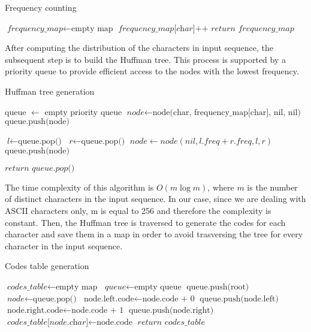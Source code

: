\documentclass{report}
\begin{document}
\begin{algorithm}
\caption{Frequency counting}
\begin{algorithmic}[1]
\State $\textit{frequency\_map} \gets \text{empty map}$
\State $\textit{frequency\_map[char]++}$
\EndFor
\State $ \textit{return frequency\_map}$
\EndProcedure
\end{algorithmic}
\end{algorithm}
After computing the distribution of the characters in input sequence,
the subsequent step is to build the Huffman tree.
This process is supported by a priority queue to provide
efficient access to the nodes with the lowest frequency.
\begin{algorithm}
\caption{Huffman tree generation}
\begin{algorithmic}[1]
\State queue $\gets$ empty priority queue
\State $\textit{node} \gets \text{node(char, frequency\_map[char], nil, nil)}$
\State $\text{queue.push(node)}$
\EndFor

\State $\textit{l} \gets \text{queue.pop()}$
\State $\textit{r} \gets \text{queue.pop()}$
\State $\textit{node} \gets node(nil, l.freq + r.freq, l, r)$
\State $\text{queue.push(node)}$
\EndWhile

\State $ \textit{return queue.pop()}$

\EndProcedure
\end{algorithmic}
\end{algorithm}
The time complexity of this algorithm is $O(m \log m)$,
where $m$ is the number of distinct characters in the input sequence.
In our case, since we are dealing with ASCII characters only,
m is equal to 256 and therefore the complexity is constant.
Then, the Huffman tree is traversed to generate the codes for each character
and save them in a map in order to avoid trasversing the tree for
every character in the input sequence.
\begin{algorithm}
\caption{Codes table generation}
\begin{algorithmic}[1]
\State $\textit{codes\_table} \gets \text{empty map}$
\State $\textit{queue} \gets \text{empty queue}$
\State $\text{queue.push(root)}$
\State $\textit{node} \gets \text{queue.pop()}$
\State $\text{node.left.code} \gets \text{node.code + 0}$
\State $\text{queue.push(node.left)}$
\EndIf
{}
\State $\text{node.right.code} \gets \text{node.code + 1}$
\State $\text{queue.push(node.right)}$
\EndIf
{}
\State $\textit{codes\_table[node.char]} \gets \text{node.code}$
\EndIf
\EndWhile
\State $ \textit{return codes\_table}$
\EndProcedure
\end{algorithmic}
\end{algorithm}
\end{document}

